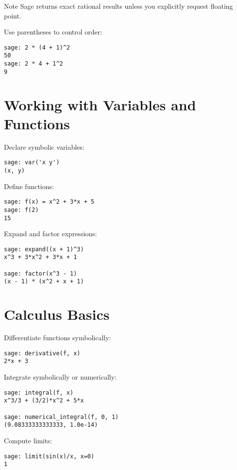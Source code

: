 \documentclass[12pt]{book}
\begin{document}
Note Sage returns exact rational results unless you explicitly request floating point.

Use parentheses to control order:

\begin{verbatim}
sage: 2 * (4 + 1)^2
50
sage: 2 * 4 + 1^2
9
\end{verbatim}

\section{Working with Variables and Functions}

Declare symbolic variables:

\begin{verbatim}
sage: var('x y')
(x, y)
\end{verbatim}

Define functions:

\begin{verbatim}
sage: f(x) = x^2 + 3*x + 5
sage: f(2)
15
\end{verbatim}

Expand and factor expressions:

\begin{verbatim}
sage: expand((x + 1)^3)
x^3 + 3*x^2 + 3*x + 1

sage: factor(x^3 - 1)
(x - 1) * (x^2 + x + 1)
\end{verbatim}

\section{Calculus Basics}

Differentiate functions symbolically:

\begin{verbatim}
sage: derivative(f, x)
2*x + 3
\end{verbatim}

Integrate symbolically or numerically:

\begin{verbatim}
sage: integral(f, x)
x^3/3 + (3/2)*x^2 + 5*x

sage: numerical_integral(f, 0, 1)
(9.08333333333333, 1.0e-14)
\end{verbatim}

Compute limits:

\begin{verbatim}
sage: limit(sin(x)/x, x=0)
1
\end{verbatim}
\end{document}
